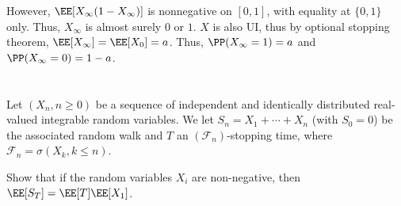 \documentclass[11pt, headheight=30pt]{scrartcl}
\begin{document}
However, $\EE[X_\infty(1-X_\infty)]$ is nonnegative on $[0,1]$, with
equality at $\{0,1\}$ only. Thus, $X_\infty$ is almost surely $0$ or $1$.
$X$ is also UI, thus by optional stopping theorem, $\EE[X_\infty] = \EE[X_0] = a$.
Thus, $\PP(X_\infty = 1) = a$ and $\PP(X_\infty = 0) = 1 - a$.


\section{}
Let $(X_n, n \geq 0)$ be a sequence of independent and identically distributed real-valued
integrable random variables. We let $S_n = X_1 + \cdots + X_n$ (with $S_0 = 0$) be the associated random
walk and $T$ an $(\mathscr{F}_n)$-stopping time, where $\mathscr{F}_n = \sigma(X_k, k \leq n)$.
\begin{prob}
    Show that if the random variables $X_i$ are non-negative, then
    $\EE[S_T] = \EE[T]\EE[X_1]$.
\end{prob}

\end{document}
